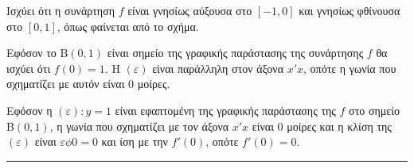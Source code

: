 \begin{alist}
\item  Ισχύει ότι η συνάρτηση $f$ είναι γνησίως αύξουσα στο $[-1,0]$ και γνησίως φθίνουσα στο $[0,1]$, όπως φαίνεται από το σχήμα.
\item 
\begin{rlist}
\item Εφόσον το Β$(0,1)$ είναι σημείο της γραφικής παράστασης της συνάρτησης $f$ θα ισχύει ότι $f(0) = 1$. Η $(\varepsilon)$ είναι παράλληλη στον άξονα $x'x$, οπότε η γωνία που σχηματίζει με αυτόν είναι $0$ μοίρες.
\item Εφόσον η $(\varepsilon): y=1$ είναι εφαπτομένη της γραφικής παράστασης της $f$ στο σημείο Β$(0,1)$, η γωνία που σχηματίζει με τον άξονα $x'x$ είναι $0$ μοίρες και η κλίση της $(\varepsilon)$ είναι $\varepsilon\phi 0=0$ και ίση με την $f'(0)$, οπότε $f'(0) = 0$.
\end{rlist}
\end{alist}
\vspace{6mm}
\noindent\rule{\textwidth}{0.4pt}
\vspace{6mm}

